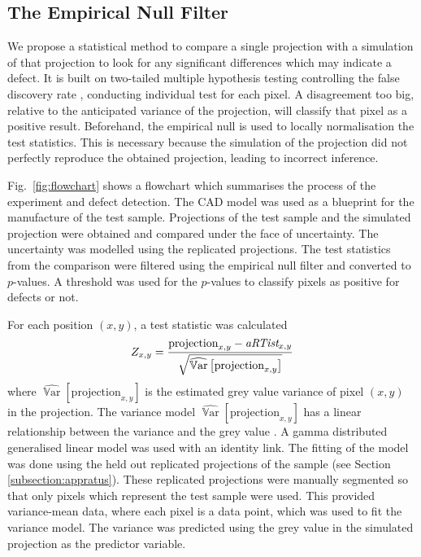 \documentclass{article}
\DeclareMathOperator{\variance}{\mathbb{V}ar}
\begin{document}
\subsection{The Empirical Null Filter}
\label{subsection:empiricalnullfilter}

We propose a statistical method to compare a single projection with a simulation of that projection to look for any significant differences which may indicate a defect. It is built on two-tailed multiple hypothesis testing \citep{fisher1970statistical, neyman1933on, pearson1900on} controlling the false discovery rate \citep{benjamini2010discovering, benjamini1995controlling}, conducting individual test for each pixel. A disagreement too big, relative to the anticipated variance of the projection, will classify that pixel as a positive result. Beforehand, the empirical null \citep{efron2004large} is used to locally normalisation \citep{sage2018local, sage2003teaching} the test statistics. This is necessary because the simulation of the projection did not perfectly reproduce the obtained projection, leading to incorrect inference.

Fig.~\ref{fig:flowchart} shows a flowchart which summarises the process of the experiment and defect detection. The CAD model was used as a blueprint for the manufacture of the test sample. Projections of the test sample and the simulated projection were obtained and compared under the face of uncertainty. The uncertainty was modelled using the replicated projections. The test statistics from the comparison were filtered using the empirical null filter and converted to $p$-values. A threshold was used for the $p$-values to classify pixels as positive for defects or not.

For each position $(x,y)$, a test statistic was calculated
\begin{equation}
  Z_{x,y} = 
  \dfrac{
    \text{projection}_{x,y} - \emph{aRTist}_{x,y}
  }
  {
    \sqrt{\widehat{\variance}\left[\text{projection}_{x,y}\right]}
  }
\end{equation}
where $\widehat{\variance}\left[\text{projection}_{x,y}\right]$ is the estimated grey value variance of pixel $(x,y)$ in the projection. The variance model $\widehat{\variance}\left[\text{projection}_{x,y}\right]$ has a linear relationship between the variance and the grey value \citep{yang2010noise}. A gamma distributed generalised linear model \citep{mccullagh1984generalized, nelder1972generalized} was used with an identity link. The fitting of the model was done using the held out replicated projections of the sample (see Section \ref{subsection:appratus}). These replicated projections were manually segmented so that only pixels which represent the test sample were used. This provided variance-mean data, where each pixel is a data point, which was used to fit the variance model. The variance was predicted using the grey value in the simulated projection as the predictor variable.
\end{document}
